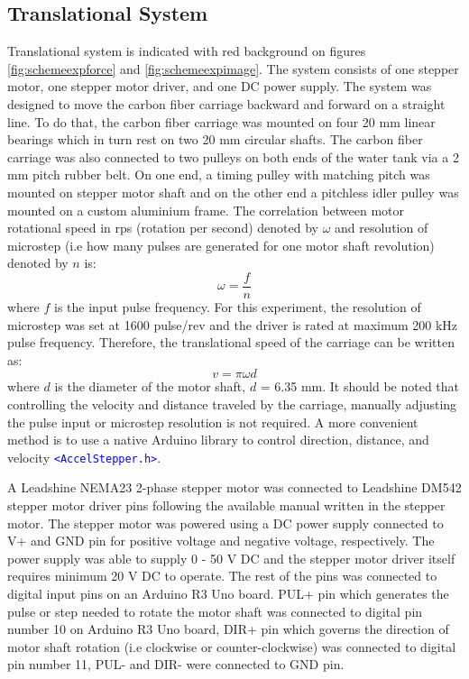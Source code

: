 \subsection{Translational System}
\label{sec:forback}
Translational system is indicated with red background on figures \ref{fig:schemeexpforce} and \ref{fig:schemeexpimage}. The system consists of one stepper motor, one stepper motor driver, and one DC power supply. The system was designed to move the carbon fiber carriage backward and forward on a straight line. To do that, the carbon fiber carriage was mounted on four 20 mm linear bearings which in turn rest on two 20 mm circular shafts. The carbon fiber carriage was also connected to two pulleys on both ends of the water tank via a 2 mm pitch rubber belt. On one end, a timing pulley with matching pitch was mounted on stepper motor shaft and on the other end a pitchless idler pulley was mounted on a custom aluminium frame. The correlation between motor rotational speed in rps (rotation per second) denoted by $\omega$ and resolution of microstep (i.e how many pulses are generated for one motor shaft revolution) denoted by $n$ is:
\begin{equation}
    \omega = \frac{f}{n}
    \label{eq:pprtorotspeed}
\end{equation}
where $f$ is the input pulse frequency. For this experiment, the resolution of microstep was set at 1600 pulse/rev and the driver is rated at maximum 200 kHz pulse frequency. Therefore, the translational speed of the carriage can be written as:
\begin{equation}
    v = \pi\omega d
    \label{eq:omega2vel}
\end{equation}
where $d$ is the diameter of the motor shaft, $d$ = 6.35 mm. It should be noted that controlling the velocity and distance traveled by the carriage, manually adjusting the pulse input or microstep resolution is not required. A more convenient method is to use a native Arduino library to control direction, distance, and velocity \texttt{\textcolor{blue}{<AccelStepper.h>}}.\par
A Leadshine NEMA23 2-phase stepper motor was connected to Leadshine DM542 stepper motor driver pins following the available manual written in the stepper motor. The stepper motor was powered using a DC power supply connected to V+ and GND pin for positive voltage and negative voltage, respectively. The power supply was able to supply 0 - 50 V DC and the stepper motor driver itself requires minimum 20 V DC to operate. The rest of the pins was connected to digital input pins on an Arduino R3 Uno board. PUL+ pin which generates the pulse or step needed to rotate the motor shaft was connected to digital pin number 10 on Arduino R3 Uno board, DIR+ pin which governs the direction of motor shaft rotation (i.e clockwise or counter-clockwise) was connected to digital pin number 11, PUL- and DIR- were connected to GND pin.\par
